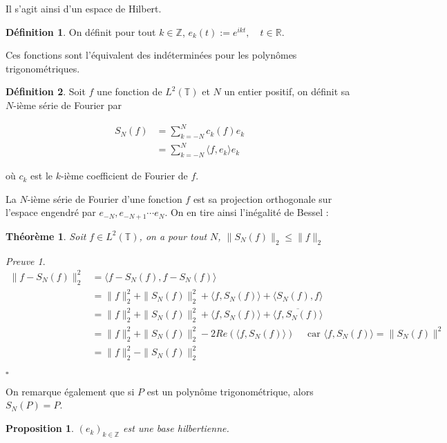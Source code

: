 \documentclass[]{article}
\newtheorem{mythm}{Théorème}
\newtheorem{myproposition}{Proposition}
\theoremstyle{remark}
\newtheorem{myproof}{Preuve}
\theoremstyle{definition}
\newtheorem{mydef}{Définition}
\newcommand{\cqfd}{
	\hfill$\square$
}
\begin{document}
		 Il s'agit ainsi d'un espace de Hilbert.
		 
		\begin{mydef}
			On définit pour tout $k \in \mathbb{Z}$,  $e_k(t):=e^{ikt}, \quad t\in \mathbb{R}.$	
		\end{mydef}
		
		Ces fonctions sont l'équivalent des indéterminées pour les polynômes trigonométriques.
		
		\begin{mydef}
			Soit $f$ une fonction de $L^2(\mathbb{T})$ et $N$ un entier positif, on définit sa $N$-ième série de Fourier par
			
			\begin{align*}
				S_N(f) &= \sum_{k = -N}^N c_k(f) e_k \\
				&= \sum_{k = -N}^N \langle f, e_k \rangle e_k
			\end{align*}
			
			où $c_k$ est le $k$-ième coefficient de Fourier de $f$.
		\end{mydef}

		La $N$-ième série de Fourier d'une fonction $f$ est sa projection orthogonale sur l'espace engendré par $e_{-N}, e_{-N+1} \cdots e_N$. On en tire ainsi l'inégalité de Bessel :
		
		\begin{mythm}
			Soit $f \in L^2(\mathbb{T})$, on a pour tout $N$, $\|S_N(f)\|_2 \leqslant \|f\|_2$
		\end{mythm}
		
		\begin{myproof}
			\begin{align*}
				\| f - S_N(f) \|^2_2 &= \langle f - S_N(f), f -S_N(f) \rangle \\
									 & = \| f \|^2_2 + \| S_N(f)\|^2_2 + \langle f, S_N(f) \rangle + \langle S_N(f), f \rangle \\ 
									 & = \| f \|^2_2 + \| S_N(f)\|^2_2 + \langle f, S_N(f) \rangle + \overline {\langle  f, S_N(f)\rangle } \\
									 &= \| f \|^2_2 + \| S_N(f)\|^2_2 - 2Re (\langle f, S_N(f) \rangle) \quad \text{ car } \langle f, S_N(f) \rangle = \| S_N(f)\|^2 \\
									 &=  \| f \|^2_2 - \| S_N(f)\|^2_2  			  
			\end{align*}
			\cqfd
		\end{myproof}
			On remarque également que si $P$ est un polynôme trigonométrique, alors $S_N(P) = P$. 
			
			\begin{myproposition}
				$ (e_k)_{k\in\mathbb{Z}} $ est une base hilbertienne.
			\end{myproposition}
			
\end{document}
